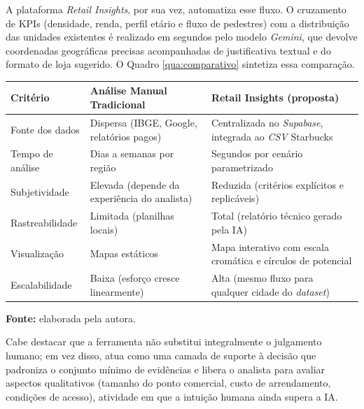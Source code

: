 A plataforma \textit{Retail Insights}, por sua vez, automatiza esse fluxo. O cruzamento de KPIs (densidade, renda, perfil etário e fluxo de pedestres) com a distribuição das unidades existentes é realizado em segundos pelo modelo \textit{Gemini}, que devolve coordenadas geográficas precisas acompanhadas de justificativa textual e do formato de loja sugerido. O Quadro \ref{qua:comparativo} sintetiza essa comparação.

\begin{quadro}[H]
    \centering
    \captionsetup{justification=raggedright, singlelinecheck=false}
    \caption{Comparativo entre análise manual tradicional e a ferramenta proposta.}
    \label{qua:comparativo}
    \begin{tabular}{|p{}|p{}|p{}|}
    \hline
    \textbf{Critério} & \textbf{Análise Manual Tradicional} & \textbf{Retail Insights (proposta)} \\ \hline
    Fonte dos dados & Dispersa (IBGE, Google, relatórios pagos) & Centralizada no \textit{Supabase}, integrada ao \textit{CSV} Starbucks \\ \hline
    Tempo de análise & Dias a semanas por região & Segundos por cenário parametrizado \\ \hline
    Subjetividade & Elevada (depende da experiência do analista) & Reduzida (critérios explícitos e replicáveis) \\ \hline
    Rastreabilidade & Limitada (planilhas locais) & Total (relatório técnico gerado pela IA) \\ \hline
    Visualização & Mapas estáticos & Mapa interativo com escala cromática e círculos de potencial \\ \hline
    Escalabilidade & Baixa (esforço cresce linearmente) & Alta (mesmo fluxo para qualquer cidade do \textit{dataset}) \\ \hline
    \end{tabular}
    \vspace{0.1cm}
    \centering
    {\footnotesize \textbf{Fonte:} elaborada pela autora.\par}
\end{quadro}

Cabe destacar que a ferramenta não substitui integralmente o julgamento humano; em vez disso, atua como uma camada de suporte à decisão que padroniza o conjunto mínimo de evidências e libera o analista para avaliar aspectos qualitativos (tamanho do ponto comercial, custo de arrendamento, condições de acesso), atividade em que a intuição humana ainda supera a IA.

